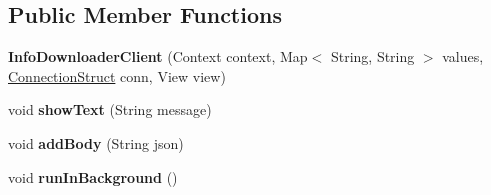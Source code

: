 \subsection*{Public Member Functions}
\begin{DoxyCompactItemize}
\item 
{\bfseries Info\+Downloader\+Client} (Context context, Map$<$ String, String $>$ values, \hyperlink{classcom_1_1example_1_1sebastian_1_1tindertp_1_1commonTools_1_1ConnectionStruct}{Connection\+Struct} conn, View view)\hypertarget{classcom_1_1example_1_1sebastian_1_1tindertp_1_1internetTools_1_1InfoDownloaderClient_a28029f376286dd760397c4dd1db025aa}{}\label{classcom_1_1example_1_1sebastian_1_1tindertp_1_1internetTools_1_1InfoDownloaderClient_a28029f376286dd760397c4dd1db025aa}

\item 
void {\bfseries show\+Text} (String message)\hypertarget{classcom_1_1example_1_1sebastian_1_1tindertp_1_1internetTools_1_1InfoDownloaderClient_acbbb215c97cd0f0d90be7543d6fb5c99}{}\label{classcom_1_1example_1_1sebastian_1_1tindertp_1_1internetTools_1_1InfoDownloaderClient_acbbb215c97cd0f0d90be7543d6fb5c99}

\item 
void {\bfseries add\+Body} (String json)\hypertarget{classcom_1_1example_1_1sebastian_1_1tindertp_1_1internetTools_1_1InfoDownloaderClient_a27ccaa781902eb95f82a8951da84fc67}{}\label{classcom_1_1example_1_1sebastian_1_1tindertp_1_1internetTools_1_1InfoDownloaderClient_a27ccaa781902eb95f82a8951da84fc67}

\item 
void {\bfseries run\+In\+Background} ()\hypertarget{classcom_1_1example_1_1sebastian_1_1tindertp_1_1internetTools_1_1InfoDownloaderClient_abb73f39b841d14e1ab56e1dd090cac1a}{}\label{classcom_1_1example_1_1sebastian_1_1tindertp_1_1internetTools_1_1InfoDownloaderClient_abb73f39b841d14e1ab56e1dd090cac1a}

\end{DoxyCompactItemize}
